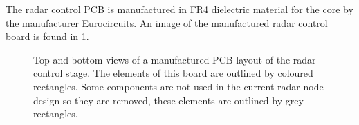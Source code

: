 The radar control PCB is manufactured in FR4 dielectric material for the core by the manufacturer Eurocircuits. An image of the manufactured radar control board is found in \cref{fig:baseband_board_general}.

\begin{figure}[htb]
	\centering
	\caption{Top and bottom views of a manufactured PCB layout of the radar control stage. The elements of this board are outlined by coloured rectangles. Some components are not used in the current radar node design so they are removed, these elements are outlined by grey rectangles. \label{fig:baseband_board_general}}
\end{figure}

